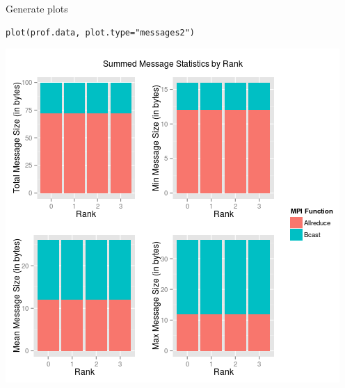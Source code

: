 \begin{frame}[fragile]
  \begin{block}{Generate plots}
  \begin{center}\vspace{-.6cm}
\begin{lstlisting}
plot(prof.data, plot.type="messages2")
\end{lstlisting}\vspace{-.2cm}
\includegraphics[scale=.39]{../common/pics/prof/messages2.png}
\end{center}
  \end{block}
\end{frame}

